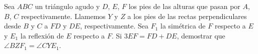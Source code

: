 Sea $ABC$ un triángulo agudo y $D$, $E$, $F$ los pies de las alturas que pasan por $A$, $B$, $C$ respectivamente.  Llamemos $Y$ y $Z$ a los pies de las rectas perpendiculares desde $B$ y $C$ a $FD$ y $DE$, respectivamente. Sea $F_1$ la simétrica de $F$ respecto a $E$ y $E_1$ la reflexión de $E$ respecto a $F$. Si $3EF=FD+DE$, demostrar que $\angle BZF_1=\angle CYE_1$.
